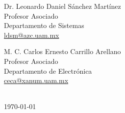 \begin{titlepage}
\begin{minipage}{0.4\textwidth}
  \centering
  Dr. Leonardo Daniel Sánchez Martínez\\%
  Profesor Asociado\\%
  Departamento de Sistemas\\%
  \href{mailto:asesora@azc.uam.mx}{ldsm@azc.uam.mx}%
\end{minipage}
\begin{minipage}{0.4\textwidth}
  \centering
  M. C. Carlos Ernesto Carrillo Arellano\\%
  Profesor Asociado\\%
  Departamento de Electr\'onica\\%
  \href{mailto:coasesora@azc.uam.mx}{ceca@xanum.uam.mx}%
\end{minipage}\\[1cm]

\today

\vfill %
\vspace*{\fill}
\end{titlepage}
